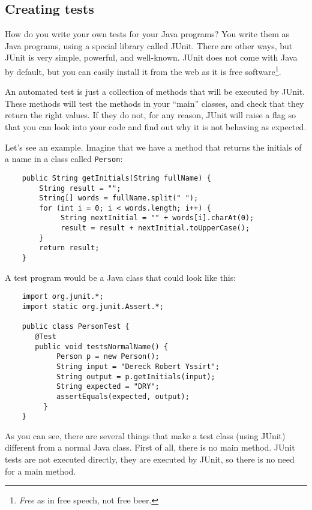\subsection{Creating tests}
\label{sec:creating-tests}

How do you write your own tests for your Java programs? You write them
as Java programs, using a special library called JUnit. There are
other ways, but JUnit is very simple, powerful, and well-known. JUnit
does not come with Java by default, but you can easily install it from
the web as it is free software\footnote{\emph{Free} as in free speech,
not free beer.}. 

An automated test is just a collection of methods that will be
executed by JUnit. These methods will test the methods in your
``main'' classes, and check that they return the right values. If they
do not, for any reason, JUnit will raise a flag so that you can look
into your code and find out why it is not behaving as expected. 

Let's see an example. Imagine that we have 
a method that returns the initials of a name
in a class called \verb+Person+: 

\begin{verbatim}
    public String getInitials(String fullName) {
        String result = "";
        String[] words = fullName.split(" ");
        for (int i = 0; i < words.length; i++) {
             String nextInitial = "" + words[i].charAt(0);
             result = result + nextInitial.toUpperCase();
        }
        return result;
    }
\end{verbatim}

A test program would be a Java class that could look like this: 

\begin{verbatim}
    import org.junit.*;
    import static org.junit.Assert.*;
    
    public class PersonTest {
       @Test
       public void testsNormalName() {
            Person p = new Person();
            String input = "Dereck Robert Yssirt";
            String output = p.getInitials(input);
            String expected = "DRY";
            assertEquals(expected, output);
         }
    }
\end{verbatim}

As you can see, there are several things that make a test class (using
JUnit) different from a normal Java class. First of all, there is no
main method. JUnit tests are not executed directly, they are executed
by JUnit, so there is no need for a main method. 

